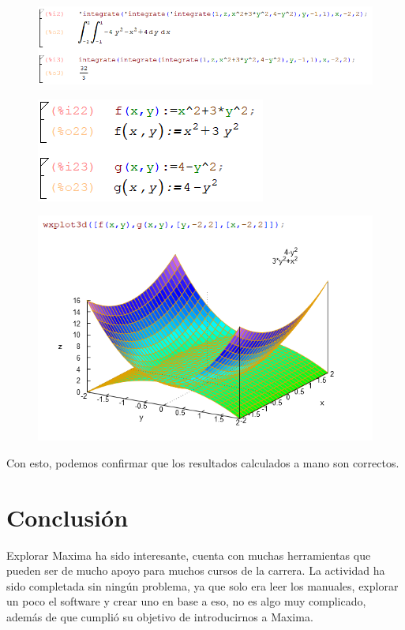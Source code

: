 \documentclass[a4paper]{article}
\begin{document}
\begin{figure}[h!]
  \centering
  \includegraphics[width=0.8\linewidth]{Ej_1.PNG}
\end{figure}
\begin{figure}[h!]
  \centering
  \includegraphics[width=0.2\linewidth]{Ej_2.PNG}
\end{figure}
\begin{figure}[h!]
  \centering
  \includegraphics[width=0.8\linewidth]{Ej_3.PNG}
\end{figure}

Con esto, podemos confirmar que los resultados calculados a mano son correctos.

\section{Conclusión}
Explorar Maxima ha sido interesante, cuenta con muchas herramientas que pueden ser de mucho apoyo para muchos cursos de la carrera. La actividad ha sido completada sin ningún problema, ya que solo era leer los manuales, explorar un poco el software y crear uno en base a eso, no es algo muy complicado, además de que cumplió su objetivo de introducirnos a Maxima.
\end{document}
